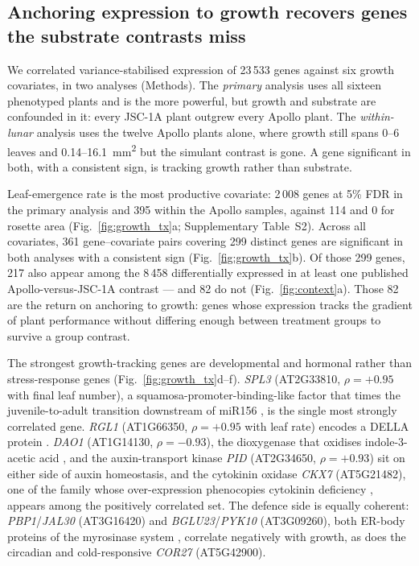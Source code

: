 \documentclass[11pt,a4paper]{article}
\begin{document}
\subsection{Anchoring expression to growth recovers genes the substrate contrasts miss}

We correlated variance-stabilised expression of 23\,533 genes against six growth
covariates, in two analyses (Methods). The \emph{primary} analysis uses all sixteen
phenotyped plants and is the more powerful, but growth and substrate are confounded in
it: every JSC-1A plant outgrew every Apollo plant. The \emph{within-lunar} analysis uses
the twelve Apollo plants alone, where growth still spans 0--6 leaves and
0.14--16.1~\si{\milli\metre\squared} but the simulant contrast is gone. A gene
significant in both, with a consistent sign, is tracking growth rather than substrate.

Leaf-emergence rate is the most productive covariate: 2\,008 genes at 5\% FDR in the
primary analysis and 395 within the Apollo samples, against 114 and 0 for rosette area
(Fig.~\ref{fig:growth_tx}a; Supplementary Table~S2). Across all covariates, 361
gene--covariate pairs covering 299 distinct genes are significant in both analyses with
a consistent sign (Fig.~\ref{fig:growth_tx}b). Of those 299 genes, 217 also appear among
the 8\,458 differentially expressed in at least one published Apollo-versus-JSC-1A
contrast --- and 82 do not (Fig.~\ref{fig:context}a). Those 82 are the return on
anchoring to growth: genes whose expression tracks the gradient of plant performance
without differing enough between treatment groups to survive a group contrast.

The strongest growth-tracking genes are developmental and hormonal rather than
stress-response genes (Fig.~\ref{fig:growth_tx}d--f). \textit{SPL3}
(AT2G33810, $\rho = +0.95$ with final leaf number), a squamosa-promoter-binding-like
factor that times the juvenile-to-adult transition downstream of miR156
\citep{wu2009spl}, is the single most strongly correlated gene. \textit{RGL1}
(AT1G66350, $\rho = +0.95$ with leaf rate) encodes a DELLA protein
\citep{sananmishra2016della}. \textit{DAO1} (AT1G14130, $\rho = -0.93$), the
dioxygenase that oxidises indole-3-acetic acid \citep{porco2016dao1}, and the auxin-transport
kinase \textit{PID} (AT2G34650, $\rho = +0.93$) sit on either side of auxin homeostasis,
and the cytokinin oxidase \textit{CKX7} (AT5G21482), one of the family whose
over-expression phenocopies cytokinin deficiency \citep{werner2003ckx}, appears among the
positively correlated set.
The defence side is equally coherent: \textit{PBP1}/\textit{JAL30} (AT3G16420) and
\textit{BGLU23}/\textit{PYK10} (AT3G09260), both ER-body proteins of the myrosinase
system \citep{nakano2017pyk10}, correlate negatively with growth, as does the circadian
and cold-responsive \textit{COR27} (AT5G42900).
\end{document}

